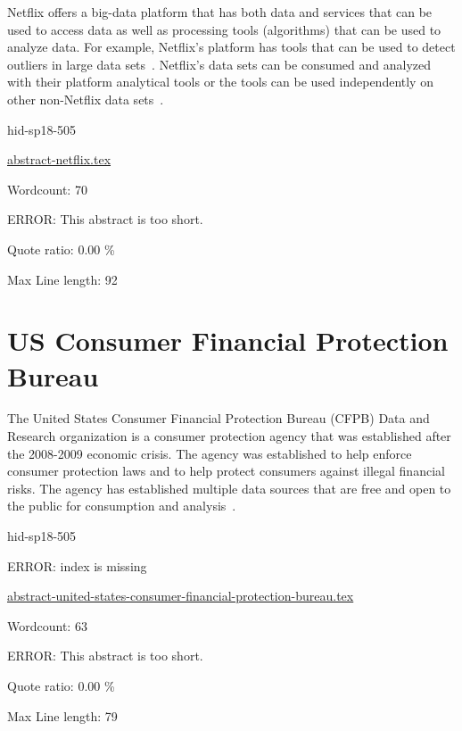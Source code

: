 Netflix offers a big-data platform that has both data and services that can be
used to access data as well as processing tools (algorithms) that can be used
to analyze data.  For example, Netflix's platform has tools that can be used to
detect outliers in large data sets~\cite{hid-sp18-505-Wong2015}.  Netflix's data sets can be
consumed and analyzed with their platform analytical tools or the tools can be
used independently on other non-Netflix data sets~\cite{hid-sp18-505-Netflix2018}.


\begin{IU}

hid-sp18-505

\href{https://github.com/cloudmesh-community/hid-sp18-505/blob/master//technology/abstract-netflix.tex}{abstract-netflix.tex}

 

Wordcount: 70

ERROR: This abstract is too short.


Quote ratio: 0.00 \%
 
Max Line length: 92
\end{IU}

\section{US Consumer Financial Protection Bureau}

The United States Consumer Financial Protection Bureau (CFPB) Data and Research
organization is a consumer protection agency that was established after the
2008-2009 economic crisis.  The agency was established to help enforce consumer
protection laws and to help protect consumers against illegal financial risks.
The agency has established multiple data sources that are free and open to the
public for consumption and analysis~\cite{hid-sp18-505-CFPB2018}.


\begin{IU}

hid-sp18-505

ERROR: index is missing

\href{https://github.com/cloudmesh-community/hid-sp18-505/blob/master//technology/abstract-united-states-consumer-financial-protection-bureau.tex}{abstract-united-states-consumer-financial-protection-bureau.tex}

 

Wordcount: 63

ERROR: This abstract is too short.


Quote ratio: 0.00 \%
 
Max Line length: 79
\end{IU}

